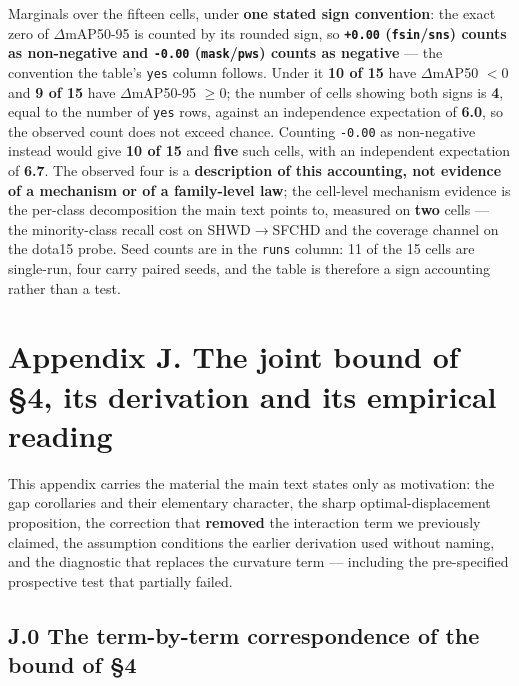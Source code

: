\documentclass[pdflatex,sn-mathphys-ay]{sn-jnl}
\begin{document}
Marginals over the fifteen cells, under \textbf{one stated sign convention}: the exact zero of $\Delta$mAP50-95 is counted by its rounded sign, so \textbf{\texttt{+0.00} (\texttt{fsin}/\texttt{sns}) counts as non-negative and \texttt{-0.00} (\texttt{mask}/\texttt{pws}) counts as negative} --- the convention the table's \texttt{yes} column follows. Under it \textbf{10 of 15} have $\Delta$mAP50 $<0$ and \textbf{9 of 15} have $\Delta$mAP50-95 $\geq 0$; the number of cells showing both signs is \textbf{4}, equal to the number of \texttt{yes} rows, against an independence expectation of \textbf{6.0}, so the observed count does not exceed chance. Counting \texttt{-0.00} as non-negative instead would give \textbf{10 of 15} and \textbf{five} such cells, with an independent expectation of \textbf{6.7}. The observed four is a \textbf{description of this accounting, not evidence of a mechanism or of a family-level law}; the cell-level mechanism evidence is the per-class decomposition the main text points to, measured on \textbf{two} cells --- the minority-class recall cost on SHWD\ensuremath{\rightarrow}SFCHD and the coverage channel on the dota15 probe. Seed counts are in the \texttt{runs} column: 11 of the 15 cells are single-run, four carry paired seeds, and the table is therefore a sign accounting rather than a test.

\section*{Appendix J. The joint bound of \S{}4, its derivation and its empirical reading}

This appendix carries the material the main text states only as motivation: the gap corollaries and their elementary character, the sharp optimal-displacement proposition, the correction that \textbf{removed} the interaction term we previously claimed, the assumption conditions the earlier derivation used without naming, and the diagnostic that replaces the curvature term --- including the pre-specified prospective test that partially failed.

\subsection*{J.0 The term-by-term correspondence of the bound of \S{}4}
\end{document}
